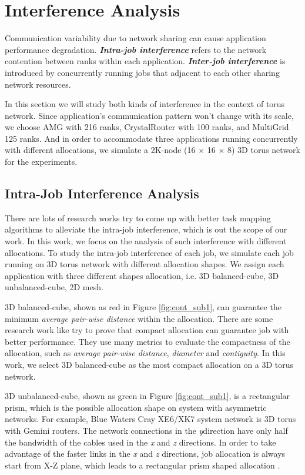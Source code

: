 \documentclass[conference]{IEEEtran}
\begin{document}
\section{Interference Analysis}
\label{sec:interference}

Communication variability due to network sharing can cause application performance degradation. \textbf{\emph{Intra-job interference}} refers to the network contention between ranks within each application. \textbf{\emph{Inter-job interference}} is introduced by concurrently running jobs that adjacent to each other sharing network resources. 

In this section we will study both kinds of interference in the context of torus network. 
Since application's communication pattern won't change with its scale, we choose AMG with 216 ranks, CrystalRouter with 100 ranks, and MultiGrid 125 ranks. And in order to accommodate three applications running concurrently with different allocations, we simulate a 2K-node (16 $\times$ 16 $\times$ 8) 3D torus network for the experiments.


\subsection{Intra-Job Interference Analysis}
\label{sec: introjob}

There are lots of research works \cite{jingjin}\cite{ozan} try to come up with better task mapping algorithms to alleviate the intra-job interference, which is out the scope of our work. In this work, we focus on the analysis of such interference with different allocations. To study the intra-job interference of each job, we simulate each job running on 3D torus network with different allocation shapes. We assign each application with three different shapes allocation, i.e. 3D balanced-cube, 3D unbalanced-cube, 2D mesh.

3D balanced-cube, shown as red in Figure \ref{fig:cont_sub1}, can guarantee the minimum \emph{average pair-wise distance} within the allocation. There are some research work like \cite{leung} \cite{abhinav-sc13} try to prove that compact allocation can guarantee job with better performance. They use many metrics to evaluate the compactness of the allocation, such as \emph{average pair-wise distance}, \emph{diameter} and \emph{contiguity}. In this work, we select 3D balanced-cube as the most compact allocation on a 3D torus network. 

3D unbalanced-cube, shown as green in Figure \ref{fig:cont_sub1}, is a rectangular prism, which is the possible allocation shape on system with asymmetric networks. For example, Blue Waters Cray XE6/XK7 system network is 3D torus with Gemini routers. The network connections in the \emph{y}direction have only half the bandwidth of the cables used in the \emph{x} and \emph{z} directions. In order to take advantage of the faster links in the \emph{x} and \emph{z} directions, job allocation is always start from X-Z plane, which leads to a rectangular prism shaped allocation \cite{RF}.
\end{document}
